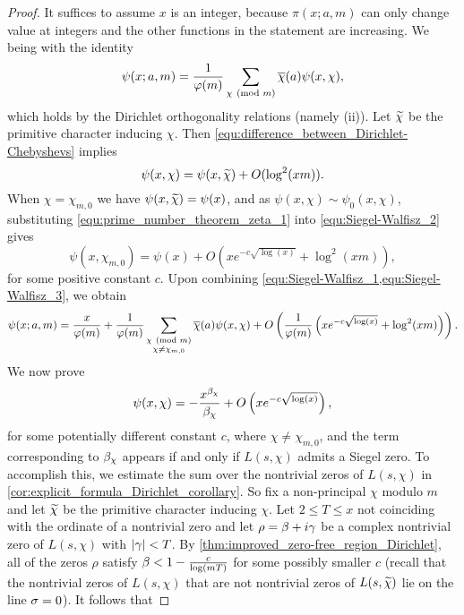     \begin{proof}
      It suffices to assume $x$ is an integer, because $\pi(x;a,m)$ can only change value at integers and the other functions in the statement are increasing. We being with the identity
      \begin{equation}\label{equ:Siegel-Walfisz_1}
        \psi(x;a,m) = \frac{1}{\varphi(m)}\sum_{\chi \ (\mathrm{mod}\text{ }m)}\overline{\chi}(a)\psi(x,\chi),
      \end{equation}
      which holds by the Dirichlet orthogonality relations (namely (ii)). Let $\widetilde{\chi}$ be the primitive character inducing $\chi$. Then \cref{equ:difference_between_Dirichlet-Chebyshevs} implies
      \begin{equation}\label{equ:Siegel-Walfisz_2}
        \psi(x,\chi) = \psi(x,\widetilde{\chi})+O(\log^{2}(xm)).
      \end{equation}
      When $\chi = \chi_{m,0}$ we have $\psi(x,\widetilde{\chi}) = \psi(x)$, and as $\psi(x,\chi) \sim \psi_{0}(x,\chi)$, substituting \cref{equ:prime_number_theorem_zeta_1} into \cref{equ:Siegel-Walfisz_2} gives
      \begin{equation}\label{equ:Siegel-Walfisz_3}
        \psi(x,\chi_{m,0}) = \psi(x)+O\left(xe^{-c\sqrt{\log(x)}}+\log^{2}(xm)\right),
      \end{equation}
      for some positive constant $c$. Upon combining \cref{equ:Siegel-Walfisz_1,equ:Siegel-Walfisz_3}, we obtain
      \begin{equation}\label{equ:Siegel-Walfisz_4}
        \psi(x;a,m) = \frac{x}{\varphi(m)}+\frac{1}{\varphi(m)}\sum_{\substack{\chi \ (\mathrm{mod}\text{ }m) \\ \chi \neq \chi_{m,0}}}\overline{\chi}(a)\psi(x,\chi)+O\left(\frac{1}{\varphi(m)}\left(xe^{-c\sqrt{\log(x)}}+\log^{2}(xm)\right)\right).
      \end{equation}
      We now prove
      \begin{equation}\label{equ:Siegel-Walfisz_5}
        \psi(x,\chi) = -\frac{x^{\beta_{\chi}}}{\beta_{\chi}}+O\left(xe^{-c\sqrt{\log(x)}}\right),
      \end{equation}
      for some potentially different constant $c$, where $\chi \neq \chi_{m,0}$, and the term corresponding to $\beta_{\chi}$ appears if and only if $L(s,\chi)$ admits a Siegel zero. To accomplish this, we estimate the sum over the nontrivial zeros of $L(s,\chi)$ in \cref{cor:explicit_formula_Dirichlet_corollary}. So fix a non-principal $\chi$ modulo $m$ and let $\widetilde{\chi}$ be the primitive character inducing $\chi$. Let $2 \le T \le x$ not coinciding with the ordinate of a nontrivial zero and let $\rho = \beta+i\gamma$ be a complex nontrivial zero of $L(s,\chi)$ with $|\gamma| < T$. By \cref{thm:improved_zero-free_region_Dirichlet}, all of the zeros $\rho$ satisfy $\beta < 1-\frac{c}{\log(mT)}$ for some possibly smaller $c$ (recall that the nontrivial zeros of $L(s,\chi)$ that are not nontrivial zeros of $L(s,\widetilde{\chi})$ lie on the line $\sigma = 0$). It follows that

\end{proof}
